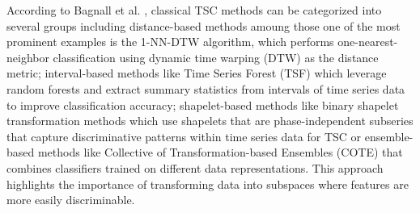 According to Bagnall et al. \cite{bagnall2017great}, classical TSC methods can be categorized into several groups including distance-based methods amoung those one of the most prominent examples is the 1-NN-DTW algorithm, which performs one-nearest-neighbor classification using dynamic time warping (DTW) as the distance metric; interval-based methods like Time Series Forest (TSF) \cite{deng2013time} which leverage random forests and extract summary statistics from intervals of time series data to improve classification accuracy; shapelet-based methods like binary shapelet transformation methods \cite{bostrom2015binary} which use shapelets that are phase-independent subseries that capture discriminative patterns within time series data for TSC or ensemble-based methods like Collective of Transformation-based Ensembles (COTE) \cite{bagnall2015time} that combines classifiers trained on different data representations. This approach highlights the importance of transforming data into subspaces where features are more easily discriminable.

